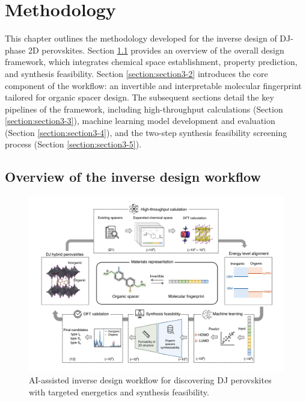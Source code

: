 \chapter[Methodology]{Methodology} \label{c:method} 

This chapter outlines the methodology developed for the inverse design of DJ-phase 2D perovskites. Section \ref{section:section3-1} provides an overview of the overall design framework, which integrates chemical space establishment, property prediction, and synthesis feasibility. Section \ref{section:section3-2} introduces the core component of the workflow: an invertible and interpretable molecular fingerprint tailored for organic spacer design. The subsequent sections detail the key pipelines of the framework, including high-throughput calculations (Section \ref{section:section3-3}), machine learning model development and evaluation (Section \ref{section:section3-4}), and the two-step synthesis feasibility screening process (Section \ref{section:section3-5}).


\section{Overview of the inverse design workflow}\label{section:section3-1}

\begin{figure}[ht]
    \centering
    \includegraphics[width=\textwidth]{figures/methodology/figure3-1.png}
    \caption{AI-assisted inverse design workflow for discovering DJ perovskites with targeted energetics and synthesis feasibility. }
    \label{fig:figure3.1}
\end{figure}

